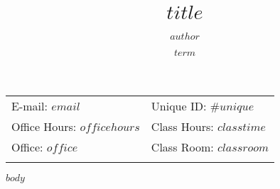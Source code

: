 \documentclass[12pt]{article}
\title{$title$}
\author{$author$}
\date{$term$}
\begin{document}
\newcommand{\canvas}{\textsc{canvas}}


\maketitle

\begin{tabular*}{.93\textwidth}{@{\extracolsep{\fill}}ll}
E-mail: \texttt{$email$} & Unique ID: \#$unique$  \\
Office Hours: $officehours$  &  Class Hours: $classtime$ \\
Office: $office$ & Class Room: $classroom$ \\
&  \\
\end{tabular*}


$body$
\end{document}
